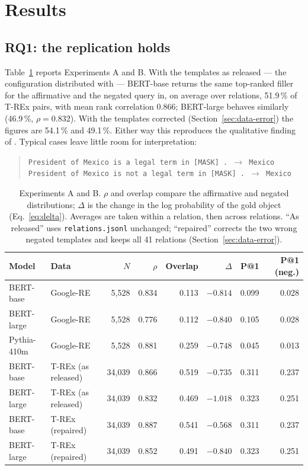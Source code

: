 \documentclass{article}
\begin{document}
\section{Results}
\label{sec:results}

\subsection{RQ1: the replication holds}
\label{sec:results-rep}

Table~\ref{tab:main} reports Experiments A and B. With the templates as released --- the
configuration distributed with \citet{kassner2020} --- BERT-base returns the same top-ranked filler for the affirmative and the negated query in, on average over relations, 51.9\,\% of T-REx pairs, with mean rank correlation 0.866;
BERT-large behaves similarly (46.9\,\%, $\rho = 0.832$). With the templates corrected
(Section~\ref{sec:data-error}) the figures are 54.1\,\% and 49.1\,\%. Either way this reproduces the
qualitative finding of \citet{kassner2020}. Typical cases leave little room for interpretation:

\begin{quote}\small
\texttt{President of Mexico is a legal term in [MASK] . $\rightarrow$ Mexico}\\
\texttt{President of Mexico is not a legal term in [MASK] . $\rightarrow$ Mexico}
\end{quote}

\begin{table}[t]
\centering\small
\caption{Experiments A and B. $\rho$ and overlap compare the affirmative and negated distributions;
$\Delta$ is the change in the log probability of the gold object (Eq.~\ref{eq:delta}). Averages are
taken within a relation, then across relations. ``As released'' uses \texttt{relations.jsonl}
unchanged; ``repaired'' corrects the two wrong negated templates and keeps all 41 relations
(Section~\ref{sec:data-error}).}
\label{tab:main}
\begin{tabular}{llrrrrrr}
\toprule
Model & Data & $N$ & $\rho$ & Overlap & $\Delta$ & P@1 & P@1 (neg.) \\
\midrule
BERT-base   & Google-RE & 5{,}528  & 0.834 & 0.113 & $-0.814$ & 0.099 & 0.028 \\
BERT-large  & Google-RE & 5{,}528  & 0.776 & 0.112 & $-0.840$ & 0.105 & 0.028 \\
Pythia-410m & Google-RE & 5{,}528  & 0.881 & 0.259 & $-0.748$ & 0.045 & 0.013 \\
\midrule
BERT-base   & T-REx (as released) & 34{,}039 & 0.866 & 0.519 & $-0.735$ & 0.311 & 0.237 \\
BERT-large  & T-REx (as released) & 34{,}039 & 0.832 & 0.469 & $-1.018$ & 0.323 & 0.251 \\
BERT-base   & T-REx (repaired)    & 34{,}039 & 0.887 & 0.541 & $-0.568$ & 0.311 & 0.237 \\
BERT-large  & T-REx (repaired)    & 34{,}039 & 0.852 & 0.491 & $-0.840$ & 0.323 & 0.251 \\
\bottomrule
\end{tabular}
\end{table}
\end{document}

